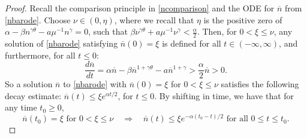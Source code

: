 \documentclass[12pt]{article}
\theoremstyle{plain}
\begin{document}
\begin{proof}
Recall the comparison principle in \eqref{ncomparison} and the ODE for $\overline{n}$ from \eqref{nbarode}. Choose $\nu \in (0, \eta)$, where we recall that $\eta$ is the positive zero of $\alpha - \beta n^{\gamma \theta} - a\mu^{-1} n^{\gamma} = 0$, such that $\displaystyle \beta \nu^{\gamma \theta} + a \mu^{-1} \nu^{\gamma} < \frac{\alpha}{2}$. Then, for $0 < \xi \le \nu$, any solution of \eqref{nbarode} satisfying $\overline{n}(0) = \xi$ is defined for all $t \in (-\infty, \infty)$, and furthermore, for all $t \le 0$:
\begin{equation*}
\frac{d\overline{n}}{dt} = \alpha \overline{n} - \beta \overline{n}^{1 + \gamma \theta} - a\overline{n}^{1 + \gamma} > \frac{\alpha}{2}\overline{n} > 0.
\end{equation*}
So a solution $\overline{n}$ to \eqref{nbarode} with $\overline{n}(0) = \xi$ for $0 < \xi \le \nu$ satisfies the following decay estimate: $\overline{n}(t) \le \xi e^{\alpha t/2}$, for $t \le 0$. By shifting in time, we have that for any time $t_{0} \ge 0$, 
\begin{equation}\label{nuexpdecay}
\overline{n}(t_{0}) = \xi \text{ for } 0 < \xi \le \nu \quad \Longrightarrow \quad \overline{n}(t) \le \xi e^{-\alpha(t_0 - t)/2} \text{ for all } 0 \le t \le t_0.
\end{equation}


\end{proof}
\end{document}
